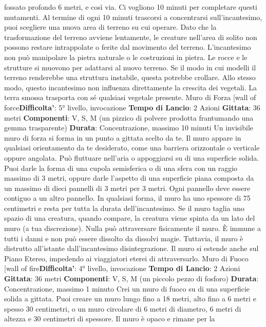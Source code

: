 \begin{multicols}{2}
fossato profondo 6 metri, e così via. Ci vogliono 10
minuti per completare questi mutamenti.
Al termine di ogni 10 minuti trascorsi a concentrarsi
sull’incantesimo, puoi scegliere una nuova area di
terreno su cui operare.
Dato che la trasformazione del terreno avviene
lentamente, le creature nell’area di solito non possono
restare intrappolate o ferite dal movimento del terreno.
L’incantesimo non può manipolare la pietra naturale o
le costruzioni in pietra. Le rocce e le strutture si
muovono per adattarsi al nuovo terreno. Se il modo in
cui modelli il terreno renderebbe una struttura instabile,
questa potrebbe crollare.
Allo stesso modo, questo incantesimo non influenza
direttamente la crescita dei vegetali. La terra smossa
trasporta con sé qualsiasi vegetale presente.
Muro di Forza
[wall of force\textbf{Difficolta'}:
5° livello, invocazione
\textbf{Tempo di Lancio}: 2 Azioni
\textbf{Gittata}: 36 metri
\textbf{Componenti}: V, S, M (un pizzico di polvere prodotta
frantumando una gemma trasparente)
\textbf{Durata}: Concentrazione, massimo 10 minuti
Un invisibile muro di forza si forma in un punto a gittata
scelto da te. Il muro appare in qualsiasi orientamento
da te desiderato, come una barriera orizzontale o
verticale oppure angolata. Può fluttuare nell’aria o
appoggiarsi su di una superficie solida. Puoi darle la
forma di una cupola semisferica o di una sfera con un
raggio massimo di 3 metri, oppure darle l’aspetto di una
superficie piana composta da un massimo di dieci
pannelli di 3 metri per 3 metri. Ogni pannello deve
essere contiguo a un altro pannello. In qualsiasi forma,
il muro ha uno spessore di 75 centimetri e resta per
tutta la durata dell’incantesimo. Se il muro taglia uno
spazio di una creatura, quando compare, la creatura
viene spinta da un lato del muro (a tua discrezione).
Nulla può attraversare fisicamente il muro. È immune a
tutti i danni e non può essere dissolto da dissolvi magie.
Tuttavia, il muro è distrutto all’istante dall’incantesimo
disintegrazione. Il muro si estende anche sul Piano
Etereo, impedendo ai viaggiatori eterei di attraversarlo.
Muro di Fuoco
[wall of fire\textbf{Difficolta'}:
4° livello, invocazione
\textbf{Tempo di Lancio}: 2 Azioni
\textbf{Gittata}: 36 metri
\textbf{Componenti}: V, S, M (un piccolo pezzo di fosforo)
\textbf{Durata}: Concentrazione, massimo 1 minuto
Crei un muro di fuoco su di una superficie solida a
gittata. Puoi creare un muro lungo fino a 18 metri, alto
fino a 6 metri e spesso 30 centimetri, o un muro
circolare di 6 metri di diametro, 6 metri di altezza e 30
centimetri di spessore. Il muro è opaco e rimane per la

\end{multicols}
